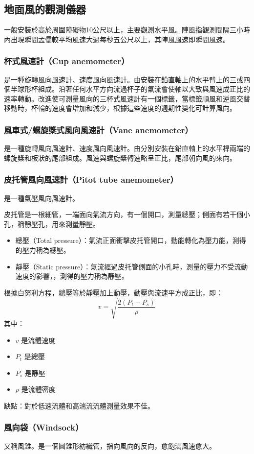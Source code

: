 \documentclass[a4paper,12pt]{report}
\begin{document}
\begin{itemize}
\subsection{地面風的觀測儀器}
一般安裝於高於周圍障礙物10公尺以上，主要觀測水平風。陣風指觀測間隔三小時內出現瞬間孟儒較平均風速大過每秒五公尺以上，其陣風風速即瞬間風速。
\subsubsection{杯式風速計（Cup anemometer）}
是一種旋轉風向風速計、速度風向風速計。由安裝在鉛直軸上的水平臂上的三或四個半球形杯組成。沿著任何水平方向流過杯子的氣流會使軸以大致與風速成正比的速率轉動。改進使可測量風向的三杯式風速計有一個標籤，當標籤順風和逆風交替移動時，杯輪的速度會增加和減少，根據這些速度的週期性變化可計算風向。
\subsubsection{風車式/螺旋槳式風向風速計（Vane anemometer）}
是一種旋轉風向風速計、速度風向風速計。由分別安裝在鉛直軸上的水平桿兩端的螺旋槳和板狀的尾部組成。風速與螺旋槳轉速略呈正比，尾部朝向風的來向。
\subsubsection{皮托管風向風速計（Pitot tube anemometer）}
是一種氣壓風向風速計。

皮托管是一根細管，一端面向氣流方向，有一個開口，測量總壓；側面有若干個小孔，稱靜壓孔，用來測量靜壓。
\begin{itemize}
\item 總壓（Total pressure）：氣流正面衝擊皮托管開口，動能轉化為壓力能，測得的壓力稱為總壓。
\item 靜壓（Static pressure）：氣流經過皮托管側面的小孔時，測量的壓力不受流動速度的影響，，測得的壓力稱為靜壓。
\end{itemize}
根據白努利方程，總壓等於靜壓加上動壓，動壓與流速平方成正比，即：
\[ v = \sqrt{\frac{2(P_t - P_s)}{\rho}} \]
其中：
\begin{itemize}
\item \( v \) 是流體速度
\item \( P_t \) 是總壓
\item \( P_s \) 是靜壓
\item \( \rho \) 是流體密度
\end{itemize}
缺點：對於低速流體和高湍流流體測量效果不佳。
\subsubsection{風向袋（Windsock）}
又稱風錐。是一個圓錐形紡織管，指向風向的反向，愈飽滿風速愈大。

\end{itemize}
\end{document}
